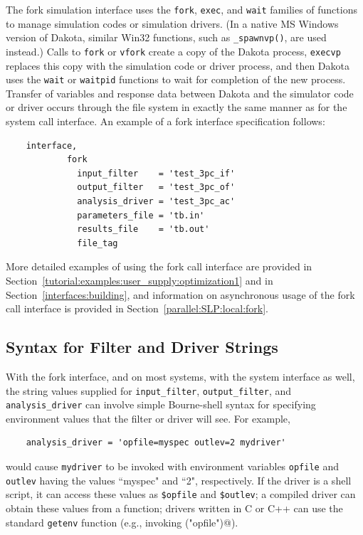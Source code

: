 The fork simulation interface uses the \texttt{fork}, \texttt{exec},
and \texttt{wait} families of functions to manage simulation codes or
simulation drivers. (In a native MS Windows version of Dakota, similar
Win32 functions, such as \texttt{\_spawnvp()}, are used instead.)
Calls to \texttt{fork} or \texttt{vfork} create a
copy of the Dakota process, \texttt{execvp} replaces this copy with
the simulation code or driver process, and then Dakota uses the
\texttt{wait} or \texttt{waitpid} functions to wait for completion of
the new process. Transfer of variables and response data between
Dakota and the simulator code or driver occurs through the file system
in exactly the same manner as for the system call interface. An
example of a fork interface specification follows:
\begin{small}
\begin{verbatim}
    interface,
            fork
              input_filter    = 'test_3pc_if'
              output_filter   = 'test_3pc_of'
              analysis_driver = 'test_3pc_ac'
              parameters_file = 'tb.in'
              results_file    = 'tb.out'
              file_tag
\end{verbatim}
\end{small}

More detailed examples of using the fork call interface are provided
in Section~\ref{tutorial:examples:user_supply:optimization1} and in
Section~\ref{interfaces:building}, and information on asynchronous usage
of the fork call interface is provided in
Section~\ref{parallel:SLP:local:fork}.


\subsection{Syntax for Filter and Driver Strings}\label{interfaces:syntax}

With the fork interface, and on most systems, with the system interface
as well, the string values supplied for \texttt{input\_filter}, \texttt{output\_filter},
and \texttt{analysis\_driver} can involve simple Bourne-shell
syntax for specifying environment values that the filter or driver will see.
For example,
\begin{verbatim}
    analysis_driver = 'opfile=myspec outlev=2 mydriver'
\end{verbatim}
would cause \texttt{mydriver} to be invoked with environment
variables \texttt{opfile} and \texttt{outlev} having the
values ``myspec" and ``2", respectively.  If the driver is a
shell script, it can access these values as \texttt{\$opfile} and
\texttt{\$outlev}; a compiled driver can obtain these values
from a function; drivers written in C or C++ can use the standard
\texttt{getenv} function (e.g., invoking \verb@getenv("opfile")@).

